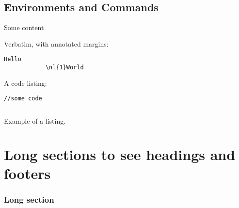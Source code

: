 \documentclass[a4paper,12pt,fleqn,twoside,openright,style=phpro]{yapbook}
\begin{document}
        \chapter{Environments and Commands}


            \begin{Exercise*}[title={This is an Exercise},difficulty=1]

            \ExePart

            Some content

            \end{Exercise*}

            Verbatim, with annotated margins:

            \begin{Verbatim}[commandchars=\\\{\}]
            Hello
            \nl{1}World
            \end{Verbatim}

            A code listing:

            \begin{lstlisting}[caption={This is the title}]
            //some code
            \end{lstlisting}

            \begin{listing}[H]
                \inputminted{php}{examplecode.php}
            \caption{Example of a listing.}
            \end{listing}



    \part{Long sections to see headings and footers}

        \section{Long section}

        \lipsum
        \lipsum
        \lipsum

\end{document}
